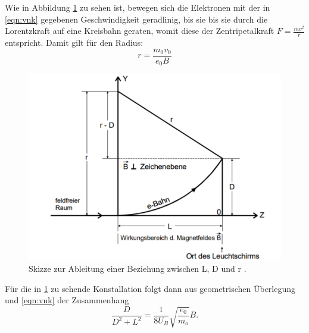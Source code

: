 Wie in Abbildung \ref{fig:WDM} zu sehen ist, bewegen sich die Elektronen mit der in \eqref{eqn:vnk} gegebenen
Geschwindigkeit geradlinig, bis sie bis sie durch die Lorentzkraft auf eine Kreisbahn
geraten, womit diese der Zentripetalkraft $F = \frac{mv^2}{r}$
entspricht. Damit gilt für den Radius:
\begin{equation}
  r=\frac{m_0 v_0}{e_0 B}
\end{equation}
\begin{figure}[H]
  \centering
  \includegraphics{Text/Bilder/WDM.png}
  \caption{ Skizze zur Ableitung einer Beziehung zwischen L, D und r \cite[89]{sample2}.}
  \label{fig:WDM}
\end{figure}
Für die in \ref{fig:WDM} zu sehende Konstallation folgt dann aus geometrischen Überlegung und \eqref{eqn:vnk} der
Zusammenhang
\begin{equation}
  \frac{D}{D^2+L^2}=\frac{1}{8U_B}\sqrt{\frac{e_0}{m_o}}B \text{.}
\end{equation}
